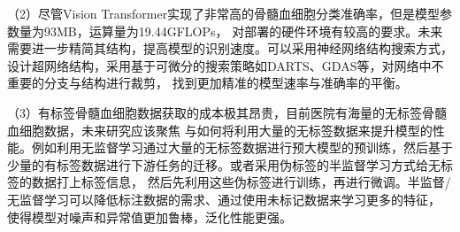 （2）尽管Vision Transformer实现了非常高的骨髓血细胞分类准确率，但是模型参数量为93MB，运算量为19.44GFLOPs，
对部署的硬件环境有较高的要求。未来需要进一步精简其结构，提高模型的识别速度。可以采用神经网络结构搜索方式，
设计超网络结构，采用基于可微分的搜索策略如DARTS\cite{liu2018darts}、GDAS\cite{dong2019searching}等，对网络中不重要的分支与结构进行裁剪，
找到更加精准的模型速率与准确率的平衡\cite{SWGC202206005}。

（3）有标签骨髓血细胞数据获取的成本极其昂贵，目前医院有海量的无标签骨髓血细胞数据，未来研究应该聚焦
与如何将利用大量的无标签数据来提升模型的性能。例如利用无监督学习\cite{berry2019supervised}通过大量的无标签数据进行预大模型的预训练，然后基于
少量的有标签数据进行下游任务的迁移。或者采用伪标签的半监督学习\cite{ouali2020overview}方式给无标签的数据打上标签信息，
然后先利用这些伪标签进行训练，再进行微调。半监督/无监督学习可以降低标注数据的需求、通过使用未标记数据来学习更多的特征，
使得模型对噪声和异常值更加鲁棒，泛化性能更强。